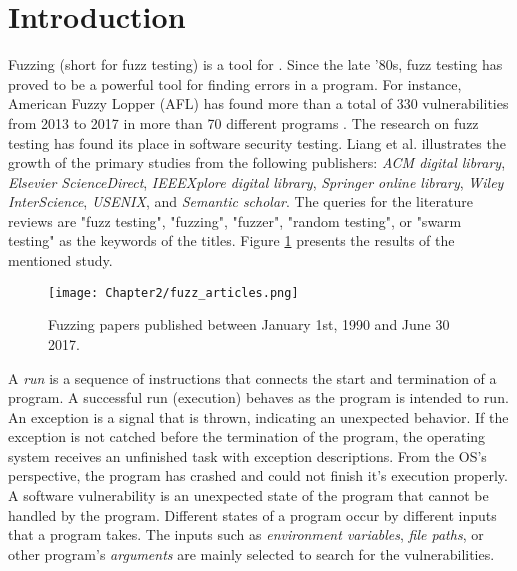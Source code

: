 \section{Introduction} \label{sec:2.1}




Fuzzing (short for fuzz testing) is a tool for . Since the late '80s, fuzz testing has proved to be a powerful tool for finding errors in a program. For instance, American Fuzzy Lopper (AFL) has found more than a total of 330 vulnerabilities from 2013 to 2017 in more than 70 different programs \cite{afl_cve}. The research on fuzz testing has found its place in software security testing. Liang et al. \cite{liang2018fuzzing} illustrates the growth of the primary studies from the following publishers: \textit{ACM digital library}, \textit{Elsevier ScienceDirect}, \textit{IEEEXplore digital library}, \textit{Springer online library}, \textit{Wiley InterScience}, \textit{USENIX}, and \textit{Semantic scholar}. The queries for the literature reviews are "fuzz testing", "fuzzing", "fuzzer", "random testing", or "swarm testing" as the keywords of the titles. Figure \ref{fig:fuzz_articles} presents the results of the mentioned study.

\begin{figure}[!t]
    \texttt{[image: Chapter2/fuzz\_articles.png]}
    \centering
    \caption{Fuzzing papers published between January 1st, 1990 and June 30 2017. \cite{liang2018fuzzing}}
    \label{fig:fuzz_articles}
\end{figure}

A \textit{run} is a sequence of instructions that connects the start and termination of a program. A successful run (execution) behaves as the program is intended to run. An exception is a signal that is thrown, indicating an unexpected behavior. If the exception is not catched before the termination of the program, the operating system receives an unfinished task with exception descriptions. From the OS's perspective, the program has crashed and could not finish it's execution properly. A software vulnerability is an unexpected state of the program that cannot be handled by the program. Different states of a program occur by different inputs that a program takes. The inputs such as \textit{environment variables}, \textit{file paths}, or other program's \textit{arguments} are mainly selected to search for the vulnerabilities. 

